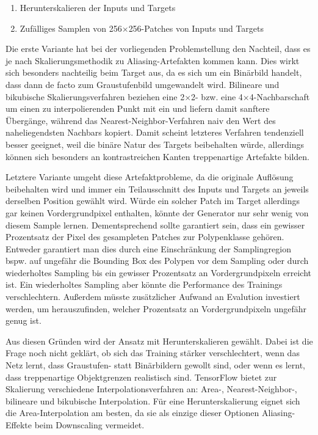 \begin{enumerate}
	\item Herunterskalieren der Inputs und Targets
	\item Zufälliges Samplen von 256$\times$256-Patches von Inputs und Targets
\end{enumerate}

Die erste Variante hat bei der vorliegenden Problemstellung den Nachteil, dass es je nach Skalierungsmethodik zu Aliasing-Artefakten kommen kann.
Dies wirkt sich besonders nachteilig beim Target aus, da es sich um ein Binärbild handelt, dass dann de facto zum Graustufenbild umgewandelt wird.
Bilineare und bikubische Skalierungsverfahren beziehen eine 2$\times$2- bzw. eine 4$\times$4-Nachbarschaft um einen zu interpolierenden Punkt mit ein und liefern damit sanftere Übergänge, während das Nearest-Neighbor-Verfahren naiv den Wert des naheliegendsten Nachbars kopiert.
Damit scheint letzteres Verfahren tendenziell besser geeignet, weil die binäre Natur des Targets beibehalten würde, allerdings können sich besonders an kontrastreichen Kanten treppenartige Artefakte bilden.

Letztere Variante umgeht diese Artefaktprobleme, da die originale Auflösung beibehalten wird und immer ein Teilausschnitt des Inputs und Targets an jeweils derselben Position gewählt wird.
Würde ein solcher Patch im Target allerdings gar keinen Vordergrundpixel enthalten, könnte der Generator nur sehr wenig von diesem Sample lernen.
Dementsprechend sollte garantiert sein, dass ein gewisser Prozentsatz der Pixel des gesampleten Patches zur Polypenklasse gehören.
Entweder garantiert man dies durch eine Einschränkung der Samplingregion bspw. auf ungefähr die Bounding Box des Polypen vor dem Sampling oder durch wiederholtes Sampling bis ein gewisser Prozentsatz an Vordergrundpixeln erreicht ist.
Ein wiederholtes Sampling aber könnte die Performance des Trainings verschlechtern.
Außerdem müsste zusätzlicher Aufwand an Evalution investiert werden, um herauszufinden, welcher Prozentsatz an Vordergrundpixeln ungefähr genug ist.

Aus diesen Gründen wird der Ansatz mit Herunterskalieren gewählt.
Dabei ist die Frage noch nicht geklärt, ob sich das Training stärker verschlechtert, wenn das Netz lernt, dass Graustufen- statt Binärbildern gewollt sind, oder wenn es lernt, dass treppenartige Objektgrenzen realistisch sind.
TensorFlow bietet zur Skalierung verschiedene Interpolationsverfahren an: Area-, Nearest-Neighbor-, bilineare und bikubische Interpolation.
Für eine Herunterskalierung eignet sich die Area-Interpolation am besten, da sie als einzige dieser Optionen Aliasing-Effekte beim Downscaling vermeidet.



